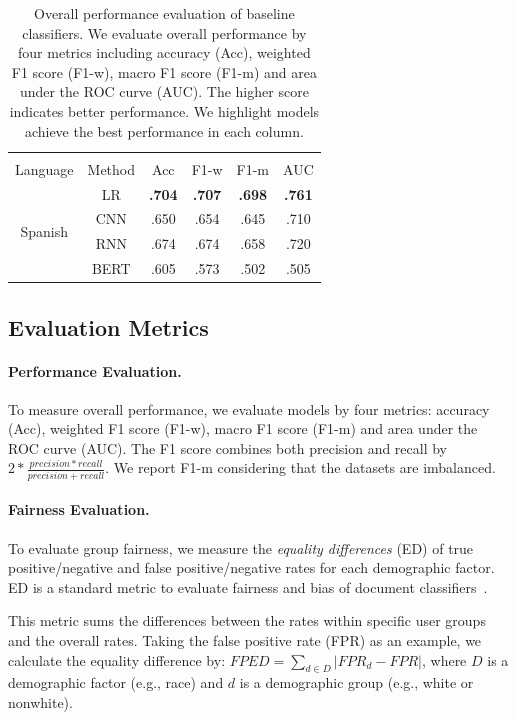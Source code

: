 \begin{table}[b!]
\begin{tabular}{cc|cccc}
\multicolumn{6}{c}{} \\
Language & Method & Acc & F1-w & F1-m & AUC \\\hline
\multirow{4}{*}{Spanish} & LR & \textbf{.704} & \textbf{.707} & \textbf{.698} & \textbf{.761} \\
 & CNN & .650 & .654 & .645 & .710\\
 & RNN & .674 & .674 & .658 & .720 \\
 & BERT & .605 & .573 & .502 & .505
\end{tabular}
\caption{Overall performance evaluation of baseline classifiers. We evaluate overall performance by four metrics including accuracy (Acc), weighted F1 score (F1-w), macro F1 score (F1-m) and area under the ROC curve (AUC). The higher score indicates better performance. We highlight models achieve the best performance in each column.}
\label{chap5:tab:perform}
\end{table}


\subsection{Evaluation Metrics}
\label{chap5:subsec:metrics}

\paragraph{Performance Evaluation.}
To measure overall performance, we evaluate models by four metrics: accuracy (Acc), weighted F1 score (F1-w), macro F1 score (F1-m) and area under the ROC curve (AUC). 
The F1 score combines both precision and recall by $2*\frac{precision*recall}{precision+recall}$.
We report F1-m considering that the datasets are imbalanced.

\paragraph{Fairness Evaluation.}
To evaluate {group fairness}, we measure the \textit{equality differences} (ED) of true positive/negative and false positive/negative rates for each demographic factor. 
ED is a standard metric to evaluate fairness and bias of document classifiers~\cite{dixon2018measuring,park2018reducing,garg2019counterfactual}.

This metric sums the differences between the rates within specific user groups and the overall rates.
Taking the false positive rate (FPR) as an example, we calculate the equality difference by:
$FPED = \sum_{d \in D}|FPR_d - FPR|$, where $D$ is a demographic factor (e.g., race) and $d$ is a demographic group (e.g., white or nonwhite).


